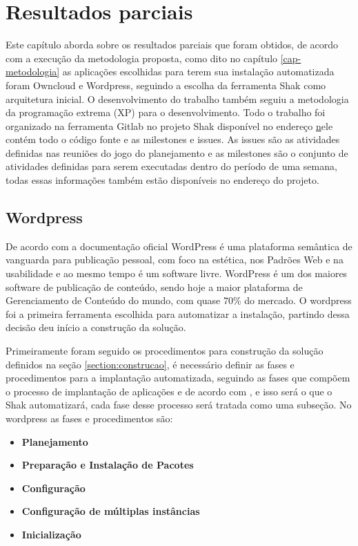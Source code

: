 \chapter{Resultados parciais}
\label{cap-resultados}

Este capítulo aborda sobre os resultados parciais que foram obtidos, de acordo
com a execução da metodologia proposta, como dito no capítulo \ref{cap-metodologia}
as aplicações escolhidas para terem sua instalação automatizada foram Owncloud e
Wordpress, seguindo a escolha da ferramenta Shak como arquitetura inicial. O
desenvolvimento do trabalho também seguiu a metodologia da programação extrema
(XP) para o desenvolvimento. Todo o trabalho foi organizado na ferramenta Gitlab
no projeto Shak disponível no endereço \href{https://gitlab.com/Shak/Shak/} nele
contém todo o código fonte e as milestones e issues. As issues são as atividades
definidas nas reuniões do jogo do planejamento e as milestones são o conjunto de
atividades definidas para serem executadas dentro do período de uma semana, todas
essas informações também estão disponíveis no endereço do projeto.


\section{Wordpress}
\label{sub:wordpress}

De acordo com a documentação oficial \cite{wordpress} WordPress é uma plataforma
semântica de vanguarda para publicação pessoal, com foco na estética, nos
Padrões Web e na usabilidade e ao mesmo tempo é um software livre. WordPress é
um dos maiores software de publicação de conteúdo, sendo hoje a maior
plataforma de Gerenciamento de Conteúdo do mundo, com quase 70\% do mercado. O
wordpress foi a primeira ferramenta escolhida para automatizar a instalação, partindo
dessa decisão deu início a construção da solução.

Primeiramente foram seguido os procedimentos para construção da solução definidos na seção \ref{section:construcao}, é
necessário definir as fases e procedimentos para a implantação automatizada,
seguindo as fases que compõem o processo de implantação de aplicações e de acordo
com \cite{omg2006}, e isso será o que o Shak automatizará, cada fase desse processo
 será tratada como uma subseção. No wordpress as fases e procedimentos são:

\begin{itemize}
  \item  \textbf{Planejamento}
  \item  \textbf{Preparação e Instalação de Pacotes}
  \item  \textbf{Configuração}
  \item  \textbf{Configuração de múltiplas instâncias}
  \item  \textbf{Inicialização}
\end{itemize}


